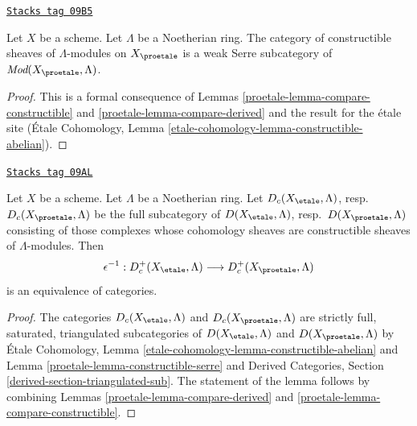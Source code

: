 \begin{lemma}
\label{proetale-lemma-constructible-serre}
\href{https://stacks.math.columbia.edu/tag/09B5}{\texttt{Stacks tag 09B5}}

Let $X$ be a scheme. Let $\Lambda$ be a Noetherian ring.
The category of constructible sheaves of $\Lambda$-modules on $X_\proetale$
is a weak Serre subcategory of $\textit{Mod}(X_\proetale, \Lambda)$.
\end{lemma}

\begin{proof}

This is a formal consequence of
Lemmas \ref{proetale-lemma-compare-constructible} and \ref{proetale-lemma-compare-derived}
and the result for the \'etale site
(\'Etale Cohomology, Lemma \ref{etale-cohomology-lemma-constructible-abelian}).
\end{proof}

\begin{lemma}
\label{proetale-lemma-compare-constructible-derived}
\href{https://stacks.math.columbia.edu/tag/09AL}{\texttt{Stacks tag 09AL}}

Let $X$ be a scheme. Let $\Lambda$ be a Noetherian ring.
Let $D_c(X_\etale, \Lambda)$, resp.\ $D_c(X_\proetale, \Lambda)$
be the full subcategory of
$D(X_\etale, \Lambda)$, resp.\ $D(X_\proetale, \Lambda)$
consisting of those complexes whose cohomology sheaves are
constructible sheaves of $\Lambda$-modules. Then
$$
\epsilon^{-1} :
D_c^+(X_\etale, \Lambda)
\longrightarrow
D_c^+(X_\proetale, \Lambda)
$$
is an equivalence of categories.
\end{lemma}

\begin{proof}

The categories $D_c(X_\etale, \Lambda)$ and $D_c(X_\proetale, \Lambda)$
are strictly full, saturated, triangulated subcategories of
$D(X_\etale, \Lambda)$ and $D(X_\proetale, \Lambda)$ by
\'Etale Cohomology, Lemma \ref{etale-cohomology-lemma-constructible-abelian}
and
Lemma \ref{proetale-lemma-constructible-serre}
and
Derived Categories, Section \ref{derived-section-triangulated-sub}.
The statement of the lemma follows by combining
Lemmas \ref{proetale-lemma-compare-derived} and
\ref{proetale-lemma-compare-constructible}.
\end{proof}

